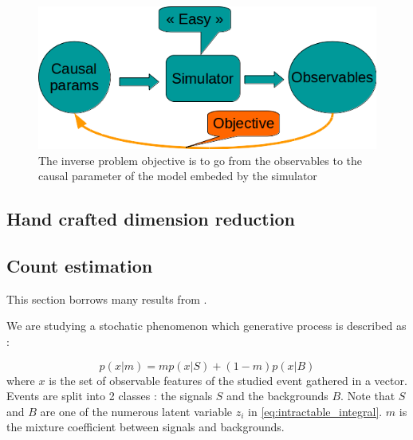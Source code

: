\begin{figure}[htb]
    \centering
    \includegraphics[width=0.8\linewidth]{inverse_problem}
    \caption{The inverse problem objective is to go from the observables to the causal parameter of the model embeded by the simulator}
    \label{fig:inverse_problem}
\end{figure}






\subsection{Hand crafted dimension reduction} %
\label{sub:hand_crafted_dimension_reduction}











\subsection{Count estimation} %
\label{sub:count_estimation}




This section borrows many results from \cite{Neal:2007zz}.

We are studying a stochatic phenomenon which generative process is described as :

\begin{equation}
	\label{eq:mixture_model}
	p(x|m) = m p(x|S) + (1-m) p(x|B)
\end{equation}
where $x$ is the set of observable features of the studied event gathered in a vector.
Events are split into 2 classes : the signals $S$ and the backgrounds $B$.
Note that $S$ and $B$ are one of the numerous latent variable $z_i$ in \autoref{eq:intractable_integral}.
$m$ is the mixture coefficient between signals and backgrounds.

